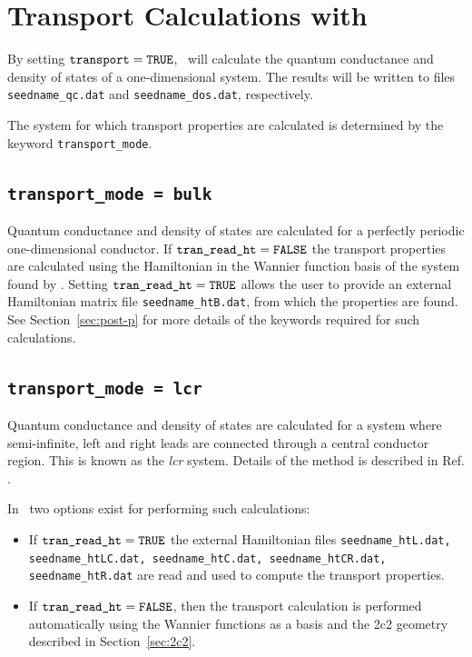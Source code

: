 \chapter{Transport Calculations with \wannier\ }\label{ch:transport}

By setting $\verb#transport#=\verb#TRUE#$, \wannier\ will calculate
the quantum conductance and density of states of a one-dimensional
system. The results will be written to files \verb#seedname_qc.dat#
and \verb#seedname_dos.dat#, respectively.

The system for which transport properties are calculated is determined
by the keyword \verb#transport_mode#.

\section{\tt transport\_mode = bulk}

Quantum conductance and density of states are calculated for a perfectly
periodic one-dimensional conductor. If $\verb#tran_read_ht#=\verb#FALSE#$
the transport properties are calculated using the Hamiltonian in the Wannier 
function basis of the system found by \wannier. Setting 
$\verb#tran_read_ht#=\verb#TRUE#$ allows the user to provide an 
external Hamiltonian matrix file {\tt seedname\_htB.dat}, from which
the properties are found. See Section~\ref{sec:post-p} for more details of 
the keywords required for such calculations.

\section{\tt transport\_mode = lcr}

Quantum conductance and density of states are calculated 
for a system where semi-infinite, left and right leads
are connected through a central conductor region. This is known 
as the \emph{lcr} system.
Details of the method is described in Ref. \cite{nardelli-prb99}.

In \wannier\ two options exist for performing such calculations: 
\begin{itemize}
\item If $\verb#tran_read_ht#=\verb#TRUE#$ the external Hamiltonian 
files {\tt seedname\_htL.dat, seedname\_htLC.dat, seedname\_htC.dat, 
seedname\_htCR.dat, seedname\_htR.dat} are read and used to compute 
the transport properties. 
\item If $\verb#tran_read_ht#=\verb#FALSE#$, then the transport
calculation is performed automatically using the Wannier functions as a
basis and the 2c2 geometry described in Section~\ref{sec:2c2}.
\end{itemize}


